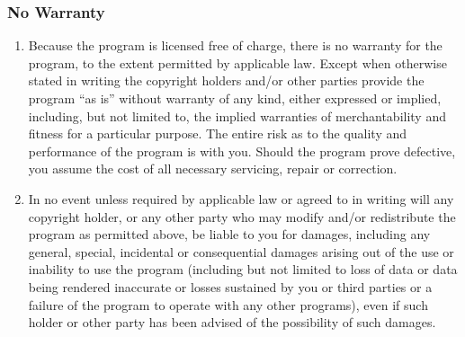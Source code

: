 \subsubsection{No Warranty}

\begin{enumerate}

\addtocounter{enumi}{9}

\item
Because the program is licensed free of charge, there is no warranty
for the program, to the extent permitted by applicable law.  Except when
otherwise stated in writing the copyright holders and/or other parties
provide the program ``as is'' without warranty of any kind, either expressed
or implied, including, but not limited to, the implied warranties of
merchantability and fitness for a particular purpose.  The entire risk as
to the quality and performance of the program is with you.  Should the
program prove defective, you assume the cost of all necessary servicing,
repair or correction.

\item
In no event unless required by applicable law or agreed to in writing
will any copyright holder, or any other party who may modify and/or
redistribute the program as permitted above, be liable to you for damages,
including any general, special, incidental or consequential damages arising
out of the use or inability to use the program (including but not limited
to loss of data or data being rendered inaccurate or losses sustained by
you or third parties or a failure of the program to operate with any other
programs), even if such holder or other party has been advised of the
possibility of such damages.
\end{enumerate}


\providecommand{\LPPLsection}{\subsection}
\providecommand{\LPPLsubsection}{\subsubsection}
\providecommand{\LPPLsubsubsection}{\subsubsection}
\providecommand{\LPPLparagraph}{\paragraph}


